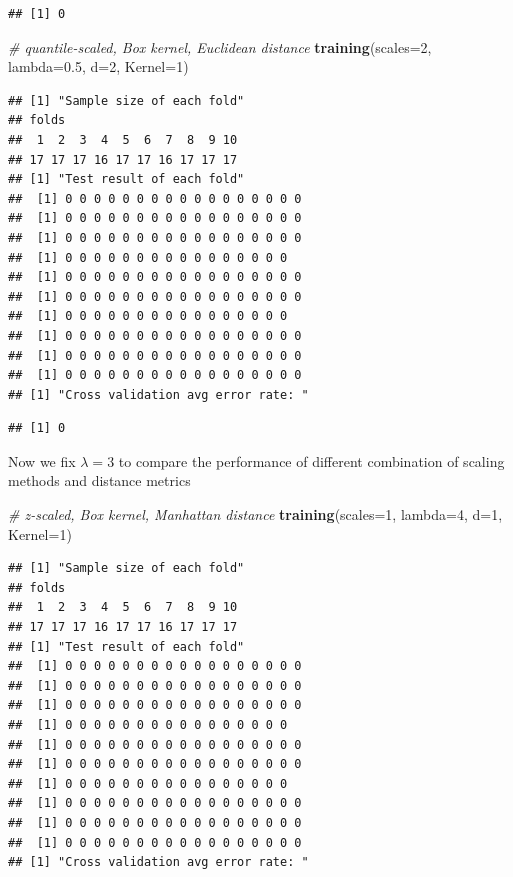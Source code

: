 \documentclass[12pt]{article}
\newenvironment{Shaded}{\begin{snugshade}}{\end{snugshade}}
\newcommand{\AttributeTok}[1]{\textcolor[rgb]{0.13,0.29,0.53}{#1}}
\newcommand{\CommentTok}[1]{\textcolor[rgb]{0.56,0.35,0.01}{\textit{#1}}}
\newcommand{\DecValTok}[1]{\textcolor[rgb]{0.00,0.00,0.81}{#1}}
\newcommand{\FloatTok}[1]{\textcolor[rgb]{0.00,0.00,0.81}{#1}}
\newcommand{\FunctionTok}[1]{\textcolor[rgb]{0.13,0.29,0.53}{\textbf{#1}}}
\newcommand{\NormalTok}[1]{#1}
\begin{document}
\begin{verbatim}
## [1] 0
\end{verbatim}

\begin{Shaded}
\begin{Highlighting}[]
\CommentTok{\# quantile{-}scaled, Box kernel, Euclidean distance}
\FunctionTok{training}\NormalTok{(}\AttributeTok{scales=}\DecValTok{2}\NormalTok{, }\AttributeTok{lambda=}\FloatTok{0.5}\NormalTok{, }\AttributeTok{d=}\DecValTok{2}\NormalTok{, }\AttributeTok{Kernel=}\DecValTok{1}\NormalTok{)}
\end{Highlighting}
\end{Shaded}

\begin{verbatim}
## [1] "Sample size of each fold"
## folds
##  1  2  3  4  5  6  7  8  9 10 
## 17 17 17 16 17 17 16 17 17 17 
## [1] "Test result of each fold"
##  [1] 0 0 0 0 0 0 0 0 0 0 0 0 0 0 0 0 0
##  [1] 0 0 0 0 0 0 0 0 0 0 0 0 0 0 0 0 0
##  [1] 0 0 0 0 0 0 0 0 0 0 0 0 0 0 0 0 0
##  [1] 0 0 0 0 0 0 0 0 0 0 0 0 0 0 0 0
##  [1] 0 0 0 0 0 0 0 0 0 0 0 0 0 0 0 0 0
##  [1] 0 0 0 0 0 0 0 0 0 0 0 0 0 0 0 0 0
##  [1] 0 0 0 0 0 0 0 0 0 0 0 0 0 0 0 0
##  [1] 0 0 0 0 0 0 0 0 0 0 0 0 0 0 0 0 0
##  [1] 0 0 0 0 0 0 0 0 0 0 0 0 0 0 0 0 0
##  [1] 0 0 0 0 0 0 0 0 0 0 0 0 0 0 0 0 0
## [1] "Cross validation avg error rate: "
\end{verbatim}

\begin{verbatim}
## [1] 0
\end{verbatim}

Now we fix \(\lambda = 3\) to compare the performance of different
combination of scaling methods and distance metrics

\begin{Shaded}
\begin{Highlighting}[]
\CommentTok{\# z{-}scaled, Box kernel, Manhattan distance}
\FunctionTok{training}\NormalTok{(}\AttributeTok{scales=}\DecValTok{1}\NormalTok{, }\AttributeTok{lambda=}\DecValTok{4}\NormalTok{, }\AttributeTok{d=}\DecValTok{1}\NormalTok{, }\AttributeTok{Kernel=}\DecValTok{1}\NormalTok{)}
\end{Highlighting}
\end{Shaded}

\begin{verbatim}
## [1] "Sample size of each fold"
## folds
##  1  2  3  4  5  6  7  8  9 10 
## 17 17 17 16 17 17 16 17 17 17 
## [1] "Test result of each fold"
##  [1] 0 0 0 0 0 0 0 0 0 0 0 0 0 0 0 0 0
##  [1] 0 0 0 0 0 0 0 0 0 0 0 0 0 0 0 0 0
##  [1] 0 0 0 0 0 0 0 0 0 0 0 0 0 0 0 0 0
##  [1] 0 0 0 0 0 0 0 0 0 0 0 0 0 0 0 0
##  [1] 0 0 0 0 0 0 0 0 0 0 0 0 0 0 0 0 0
##  [1] 0 0 0 0 0 0 0 0 0 0 0 0 0 0 0 0 0
##  [1] 0 0 0 0 0 0 0 0 0 0 0 0 0 0 0 0
##  [1] 0 0 0 0 0 0 0 0 0 0 0 0 0 0 0 0 0
##  [1] 0 0 0 0 0 0 0 0 0 0 0 0 0 0 0 0 0
##  [1] 0 0 0 0 0 0 0 0 0 0 0 0 0 0 0 0 0
## [1] "Cross validation avg error rate: "
\end{verbatim}
\end{document}
